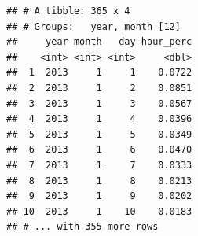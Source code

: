 \documentclass[
]{article}
\begin{document}
\begin{verbatim}
## # A tibble: 365 x 4
## # Groups:   year, month [12]
##     year month   day hour_perc
##    <int> <int> <int>     <dbl>
##  1  2013     1     1    0.0722
##  2  2013     1     2    0.0851
##  3  2013     1     3    0.0567
##  4  2013     1     4    0.0396
##  5  2013     1     5    0.0349
##  6  2013     1     6    0.0470
##  7  2013     1     7    0.0333
##  8  2013     1     8    0.0213
##  9  2013     1     9    0.0202
## 10  2013     1    10    0.0183
## # ... with 355 more rows
\end{verbatim}
\end{document}
